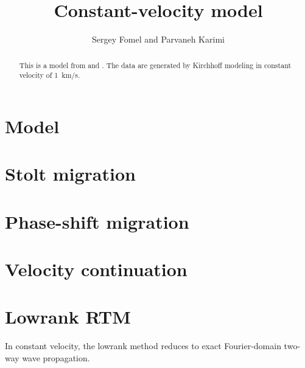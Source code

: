 \author{Sergey Fomel and Parvaneh Karimi}
\title{Constant-velocity model}

\maketitle

\begin{abstract}
This is a model from \cite{landa} and \cite{klokov}. The data are
generated by Kirchhoff modeling in constant velocity of 1~km/s.
\end{abstract}

\section{Model}

 \clearpage

\section{Stolt migration}

 \clearpage

\section{Phase-shift migration}

 \clearpage

\section{Velocity continuation}

 \clearpage

\section{Lowrank RTM}

In constant velocity, the lowrank method reduces to exact Fourier-domain two-way wave propagation.

 \clearpage


